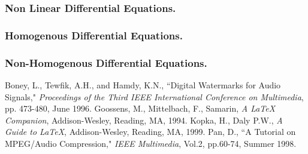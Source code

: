 \documentclass[12pt]{article}
\begin{document}
	\subsubsection{Non Linear Differential Equations.}
	\subsubsection{Homogenous Differential Equations.}
	\subsubsection{Non-Homogenous Differential Equations.}
	\newpage
\begin{thebibliography}{10}

 Boney, L., Tewfik, A.H., and Hamdy, K.N., ``Digital
Watermarks for Audio Signals," \emph{Proceedings of the Third IEEE
	International Conference on Multimedia}, pp. 473-480, June 1996.
 Goossens, M., Mittelbach, F., Samarin, \emph{A LaTeX
	Companion}, Addison-Wesley, Reading, MA, 1994.
 Kopka, H., Daly P.W., \emph{A Guide to LaTeX},
Addison-Wesley, Reading, MA, 1999.
 Pan, D., ``A Tutorial on MPEG/Audio Compression,"
\emph{IEEE Multimedia}, Vol.2, pp.60-74, Summer 1998.
\end{thebibliography}
		
	
\end{document}
